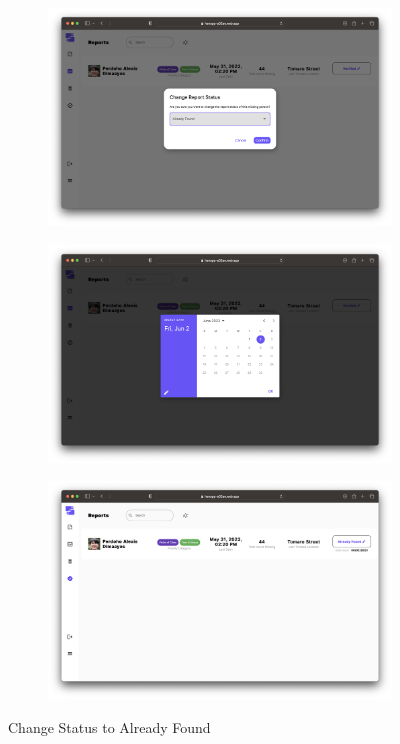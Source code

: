 \begin{figure}[!h]
    \centering
    \begin{subfigure}[c]{1\linewidth}
        \centering
        \includegraphics[scale=0.20]{figures/Chapter4/PNP/ChangeStatus-3.png}
    \end{subfigure}
    \centering
    \begin{subfigure}[c]{1\linewidth}
        \centering
        \includegraphics[scale=0.20]{figures/Chapter4/PNP/ChangeStatus-4.png}
    \end{subfigure}
    \centering
    \begin{subfigure}[c]{1\linewidth}
        \centering
        \includegraphics[scale=0.20]{figures/Chapter4/PNP/Already Found.png}
    \end{subfigure}
    \caption{Change Status to Already Found}
    \label{fig:ChangeStatusFound}
\end{figure}

